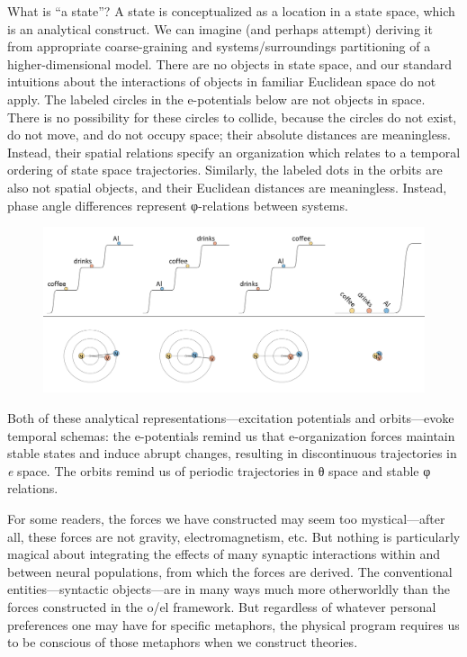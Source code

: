   What is “a state”? A state is conceptualized as a location in a state space, which is an analytical construct. We can imagine (and perhaps attempt) deriving it from appropriate coarse-graining and systems/surroundings partitioning of a higher-dimensional model. There are no objects in state space, and our standard intuitions about the interactions of objects in familiar Euclidean space do not apply. The labeled circles in the e-potentials below are not objects in space. There is no possibility for these circles to collide, because the circles do not exist, do not move, and do not occupy space; their absolute distances are meaningless. Instead, their spatial relations specify an organization which relates to a temporal ordering of state space trajectories. Similarly, the labeled dots in the orbits are also not spatial objects, and their Euclidean distances are meaningless. Instead, phase angle differences represent φ-relations between systems.

  
\begin{figure}
\includegraphics[width=\textwidth]{figures/Tilsen-img168.png}
\caption{\missingcaption}
\label{fig:}
\end{figure}
 

  Both of these analytical representations—excitation potentials and orbits—evoke temporal schemas: the e-potentials remind us that e-organization forces maintain stable states and induce abrupt changes, resulting in discontinuous trajectories in \textit{e} space. The orbits remind us of periodic trajectories in θ space and stable φ relations.

  For some readers, the forces we have constructed may seem too mystical—after all, these forces are not gravity, electromagnetism, etc. But nothing is particularly magical about integrating the effects of many synaptic interactions within and between neural populations, from which the forces are derived. The conventional entities—syntactic objects—are in many ways much more otherworldly than the forces constructed in the o/el framework. But regardless of whatever personal preferences one may have for specific metaphors, the physical program requires us to be conscious of those metaphors when we construct theories.

